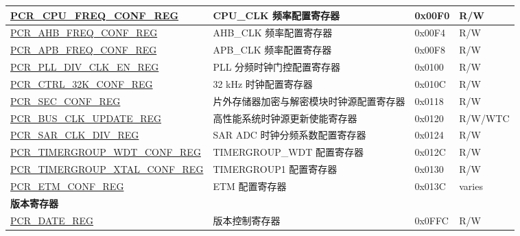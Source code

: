 \begin{longtable}{ | p{7cm} | p{6.2cm} | p{1.3cm} | p{1cm} | }
\hyperref[regdesc:PCRCPUFREQCONFREG]{PCR\_CPU\_FREQ\_CONF\_REG} & CPU\_CLK 频率配置寄存器 & 0x00F0 & R/W \\ \hline
\hyperref[regdesc:PCRAHBFREQCONFREG]{PCR\_AHB\_FREQ\_CONF\_REG} & AHB\_CLK 频率配置寄存器 & 0x00F4 & R/W \\ \hline
\hyperref[regdesc:PCRAPBFREQCONFREG]{PCR\_APB\_FREQ\_CONF\_REG} & APB\_CLK 频率配置寄存器 & 0x00F8 & R/W \\ \hline
\hyperref[regdesc:PCRPLLDIVCLKENREG]{PCR\_PLL\_DIV\_CLK\_EN\_REG} & PLL 分频时钟门控配置寄存器 & 0x0100 & R/W \\ \hline
\hyperref[regdesc:PCRCTRL32KCONFREG]{PCR\_CTRL\_32K\_CONF\_REG} & 32 kHz 时钟配置寄存器 & 0x010C & R/W \\ \hline
\hyperref[regdesc:PCRSECCONFREG]{PCR\_SEC\_CONF\_REG} & 片外存储器加密与解密模块时钟源配置寄存器 & 0x0118 & R/W \\ \hline
\hyperref[regdesc:PCRBUSCLKUPDATEREG]{PCR\_BUS\_CLK\_UPDATE\_REG} & 高性能系统时钟源更新使能寄存器 & 0x0120 & R/W/WTC \\ \hline
\hyperref[regdesc:PCRSARCLKDIVREG]{PCR\_SAR\_CLK\_DIV\_REG} & SAR ADC 时钟分频系数配置寄存器 & 0x0124 & R/W \\ \hline
\hyperref[regdesc:PCRTIMERGROUPWDTCONFREG]{PCR\_TIMERGROUP\_WDT\_CONF\_REG} & TIMERGROUP\_WDT 配置寄存器 & 0x012C & R/W \\ \hline
\hyperref[regdesc:PCRTIMERGROUPXTALCONFREG]{PCR\_TIMERGROUP\_XTAL\_CONF\_REG} & TIMERGROUP1 配置寄存器 & 0x0130 & R/W \\ \hline
\hyperref[regdesc:PCRETMCONFREG]{PCR\_ETM\_CONF\_REG} & ETM 配置寄存器 & 0x013C & varies \\ \hline
\multicolumn{4}{|l|}{\textbf{版本寄存器}} \\ \hline
\hyperref[regdesc:PCRDATEREG]{PCR\_DATE\_REG} & 版本控制寄存器 & 0x0FFC & R/W \\ \hline
\end{longtable}
